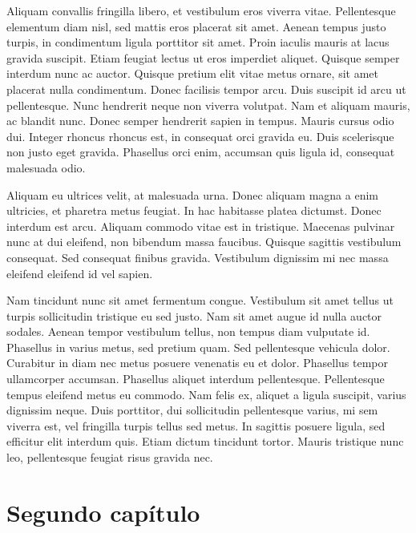 \documentclass[a4paper,twoside=false,12pt,spanish,DIV=7]{scrbook}
\begin{document}
Aliquam convallis fringilla libero, et vestibulum eros viverra vitae. Pellentesque elementum diam nisl, sed mattis eros placerat sit amet. Aenean tempus justo turpis, in condimentum ligula porttitor sit amet. Proin iaculis mauris at lacus gravida suscipit. Etiam feugiat lectus ut eros imperdiet aliquet. Quisque semper interdum nunc ac auctor. Quisque pretium elit vitae metus ornare, sit amet placerat nulla condimentum. Donec facilisis tempor arcu. Duis suscipit id arcu ut pellentesque. Nunc hendrerit neque non viverra volutpat. Nam et aliquam mauris, ac blandit nunc. Donec semper hendrerit sapien in tempus. Mauris cursus odio dui. Integer rhoncus rhoncus est, in consequat orci gravida eu. Duis scelerisque non justo eget gravida. Phasellus orci enim, accumsan quis ligula id, consequat malesuada odio.

Aliquam eu ultrices velit, at malesuada urna. Donec aliquam magna a enim ultricies, et pharetra metus feugiat. In hac habitasse platea dictumst. Donec interdum est arcu. Aliquam commodo vitae est in tristique. Maecenas pulvinar nunc at dui eleifend, non bibendum massa faucibus. Quisque sagittis vestibulum consequat. Sed consequat finibus gravida. Vestibulum dignissim mi nec massa eleifend eleifend id vel sapien.

Nam tincidunt nunc sit amet fermentum congue. Vestibulum sit amet tellus ut turpis sollicitudin tristique eu sed justo. Nam sit amet augue id nulla auctor sodales. Aenean tempor vestibulum tellus, non tempus diam vulputate id. Phasellus in varius metus, sed pretium quam. Sed pellentesque vehicula dolor. Curabitur in diam nec metus posuere venenatis eu et dolor. Phasellus tempor ullamcorper accumsan. Phasellus aliquet interdum pellentesque. Pellentesque tempus eleifend metus eu commodo. Nam felis ex, aliquet a ligula suscipit, varius dignissim neque. Duis porttitor, dui sollicitudin pellentesque varius, mi sem viverra est, vel fringilla turpis tellus sed metus. In sagittis posuere ligula, sed efficitur elit interdum quis. Etiam dictum tincidunt tortor. Mauris tristique nunc leo, pellentesque feugiat risus gravida nec.

\chapter{Segundo capítulo}
\end{document}
